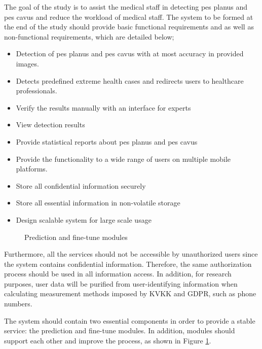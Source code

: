 The goal of the study is to assist the medical staff in detecting pes planus and pes cavus and reduce the workload of medical staff. The system to be formed at the end of the study should provide basic functional requirements and as well as non-functional requirements, which are detailed below;
\begin{itemize}
  \item Detection of pes planus and pes cavus with at most accuracy in provided images.
  \item Detects predefined extreme health cases and redirects users to healthcare professionals.
  \item Verify the results manually with an interface for experts
  \item View detection results
  \item Provide statistical reports about pes planus and pes cavus
  \item Provide the functionality to a wide range of users on multiple mobile platforms.
  \item Store all confidential information securely
  \item Store all essential information in non-volatile storage
  \item Design scalable system for large scale usage
\end{itemize}

\begin{figure}[htbp]
\centering
{}
\caption{Prediction and fine-tune modules}
\label{fig:PredictionAndFinetuneModules}
\end{figure}

Furthermore, all the services should not be accessible by unauthorized users since the system contains confidential information. Therefore, the same authorization process should be used in all information access. In addition, for research purposes, user data will be purified from user-identifying information when calculating measurement methods imposed by KVKK and GDPR, such as phone numbers.

The system should contain two essential components in order to provide a stable service: the prediction and fine-tune modules. In addition, modules should support each other and improve the process, as shown in Figure \ref{fig:PredictionAndFinetuneModules}.

